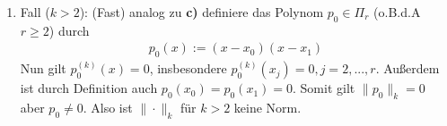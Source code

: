 \begin{solution}
\begin{enumerate}[label = \textbf{\alph*)}]
\begin{enumerate}[label = \textit{\roman*)}]
\begin{enumerate}[label = \textit{\arabic*.}]
      \item Fall ($k>2$):
      (Fast) analog zu \textbf{c)} definiere das Polynom $p_0 \in \Pi_r$ (o.B.d.A $r \geq 2$) durch
      \begin{align*}
        p_0(x) := (x-x_0)(x-x_1)
      \end{align*}
      Nun gilt $p_0^{(k)}(x) = 0$, insbesondere $p_0^{(k)}(x_j) = 0, j=2,...,r$. Außerdem ist durch Definition auch $p_0(x_0) = p_0(x_1) = 0$.
      Somit gilt $\|p_0\|_k = 0$ aber $p_0 \neq 0$. Also ist $\|\cdot\|_k$ für $k>2$ keine Norm.
    \end{enumerate}
  \end{enumerate}
\end{enumerate}
\end{solution}
